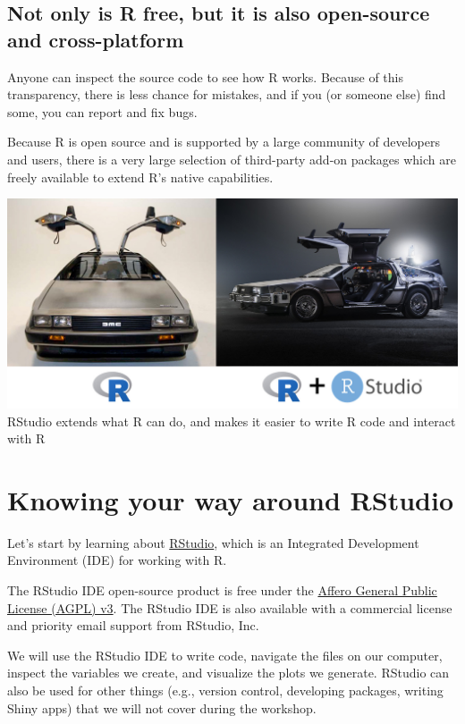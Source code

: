 \documentclass[]{book}
\begin{document}
\subsection{Not only is R free, but it is also open-source and
cross-platform}\label{not-only-is-r-free-but-it-is-also-open-source-and-cross-platform}

Anyone can inspect the source code to see how R works. Because of this
transparency, there is less chance for mistakes, and if you (or someone
else) find some, you can report and fix bugs.

Because R is open source and is supported by a large community of
developers and users, there is a very large selection of third-party
add-on packages which are freely available to extend R's native
capabilities.

\includegraphics{./fig/r+rstudio-analogy.jpg} RStudio extends what R can
do, and makes it easier to write R code and interact with R

\section{Knowing your way around
RStudio}\label{knowing-your-way-around-rstudio}

Let's start by learning about \href{https://www.rstudio.com/}{RStudio},
which is an Integrated Development Environment (IDE) for working with R.

The RStudio IDE open-source product is free under the
\href{https://www.gnu.org/licenses/agpl-3.0.en.html}{Affero General
Public License (AGPL) v3}. The RStudio IDE is also available with a
commercial license and priority email support from RStudio, Inc.

We will use the RStudio IDE to write code, navigate the files on our
computer, inspect the variables we create, and visualize the plots we
generate. RStudio can also be used for other things (e.g., version
control, developing packages, writing Shiny apps) that we will not cover
during the workshop.
\end{document}
